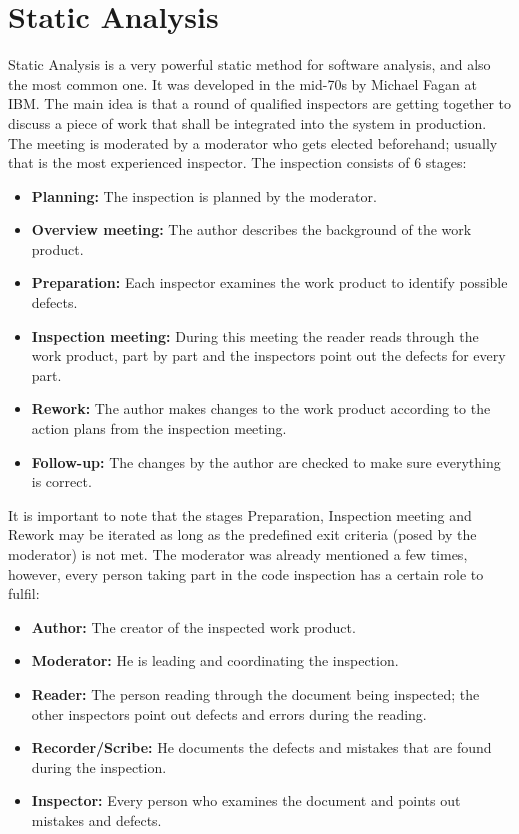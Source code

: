 \documentclass[11pt,a4paper,oneside,svgnames]{report}
\begin{document}
\section{Static Analysis}
Static Analysis is a very powerful static method for software analysis, and also the most common one. It was developed in the mid-70s by Michael Fagan at IBM. The main idea is that a round of qualified inspectors are getting together to discuss a piece of work that shall be integrated into the system in production. The meeting is moderated by a moderator who gets elected beforehand; usually that is the most experienced inspector. The inspection consists of 6 stages:
\begin{itemize}
\item \textbf{Planning:} The inspection is planned by the moderator.
\item \textbf{Overview meeting:} The author describes the background of the work product.
\item \textbf{Preparation:} Each inspector examines the work product to identify possible defects.
\item \textbf{Inspection meeting:} During this meeting the reader reads through the work product, part by part and the inspectors point out the defects for every part.
\item \textbf{Rework:} The author makes changes to the work product according to the action plans from the inspection meeting.
\item \textbf{Follow-up:} The changes by the author are checked to make sure everything is correct.
\end{itemize}
It is important to note that the stages Preparation, Inspection meeting and Rework may be iterated as long as the predefined exit criteria (posed by the moderator) is not met. 
The moderator was already mentioned a few times, however, every person taking part in the code inspection has a certain role to fulfil:
\begin{itemize}
\item \textbf{Author:} The creator of the inspected work product.
\item \textbf{Moderator:} He is leading and coordinating the inspection.
\item \textbf{Reader:} The person reading through the document being inspected; the other inspectors point out defects and errors during the reading.
\item \textbf{Recorder/Scribe:} He documents the defects and mistakes that are found during the inspection.
\item \textbf{Inspector:} Every person who examines the document and points out mistakes and defects.
\end{itemize}
\end{document}
